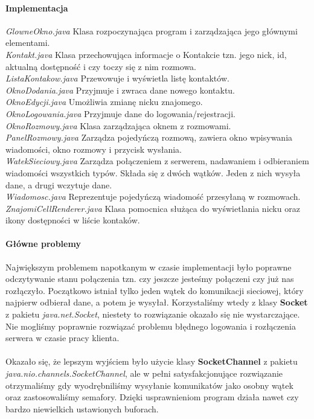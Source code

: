 \documentclass[10pt,a4paper]{article}
\begin{document}
	\paragraph{Implementacja} 
		\textit{GlowneOkno.java} Klasa rozpoczynająca program i zarządzająca jego głównymi elementami. \\
		\textit{Kontakt.java} Klasa przechowująca informacje o Kontakcie tzn. jego nick, id, aktualną dostępność i czy 
			toczy się z nim rozmowa.\\
		\textit{ListaKontakow.java} Przewowuje i wyświetla listę kontaktów. \\
		\textit{OknoDodania.java} Przyjmuje i zwraca dane nowego kontaktu. \\
		\textit{OknoEdycji.java} Umożliwia zmianę nicku znajomego. \\
		\textit{OknoLogowania.java} Przyjmuje dane do logowania/rejestracji. \\
		\textit{OknoRozmowy.java} Klasa zarządzająca oknem z rozmowami. \\
		\textit{PanelRozmowy.java} Zarządza pojedyńczą rozmową, zawiera okno wpisywania wiadomości, okno rozmowy i przycisk wysłania. \\
		\textit{WatekSieciowy.java} Zarządza połączeniem z serwerem, nadawaniem i odbieraniem wiadomości wszystkich typów.
			Składa się z dwóch wątków. Jeden z nich wysyła dane, a drugi wczytuje dane.\\
		\textit{Wiadomosc.java} Reprezentuje pojedyńczą wiadomość przesyłaną w rozmowach. \\
		\textit{ZnajomiCellRenderer.java} Klasa pomocnica służąca do wyświetlania nicku oraz ikony dostępności w liście kontaków. \\
	\paragraph{Główne problemy} Największym problemem napotkanym w czasie implementacji było poprawne odczytywanie stanu połączenia
	tzn. czy jeszcze jesteśmy połączeni czy już nas rozłączyło. Początkowo istniał tylko jeden wątek do komunikacji sieciowej, który
	najpierw odbierał dane, a potem je wysyłał. Korzystaliśmy wtedy z klasy \textbf{Socket} z pakietu \textit{java.net.Socket},
	niestety to rozwiązanie okazało się nie wystarczające. Nie mogliśmy poprawnie rozwiązać problemu błędnego logowania i 
	rozłączenia serwera w czasie pracy klienta. \\ \\
	Okazało się, że lepszym wyjściem było użycie klasy \textbf{SocketChannel} z pakietu \textit{java.nio.channels.SocketChannel}, 
	ale w pełni satysfakcjonujące rozwiązanie otrzymaliśmy gdy wyodrębniliśmy wysyłanie komunikatów jako osobny wątek oraz 
	zastosowaliśmy semafory. Dzięki usprawnieniom program działa nawet czy bardzo niewielkich ustawionych buforach.
	
\end{document}
